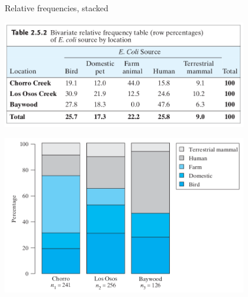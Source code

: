 \begin{frame}{Relative frequencies, stacked}
    \begin{center}
            \includegraphics[width=0.8\textwidth]{ecoli-freqs-tab2_5_2.png}

            \includegraphics[width=0.8\textwidth]{ecoli-freqs-fig2_5_2.png}
    \end{center}
\end{frame}


